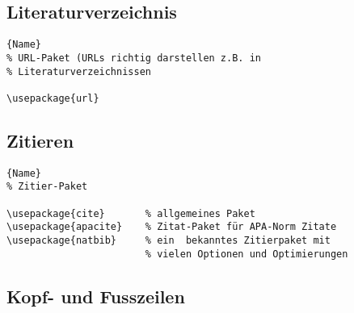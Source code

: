 \subsection{Literaturverzeichnis}

\begin{center}
\begin{lstlisting}[caption=Auflistungen]{Name}
% URL-Paket (URLs richtig darstellen z.B. in
% Literaturverzeichnissen

\usepackage{url}
\end{lstlisting}
\end{center}

\subsection{Zitieren}

\begin{center}
\begin{lstlisting}[caption=Zitieren]{Name}
% Zitier-Paket

\usepackage{cite}       % allgemeines Paket
\usepackage{apacite}    % Zitat-Paket für APA-Norm Zitate
\usepackage{natbib}     % ein  bekanntes Zitierpaket mit
                        % vielen Optionen und Optimierungen
\end{lstlisting}
\end{center}

\subsection{Kopf- und Fusszeilen}

